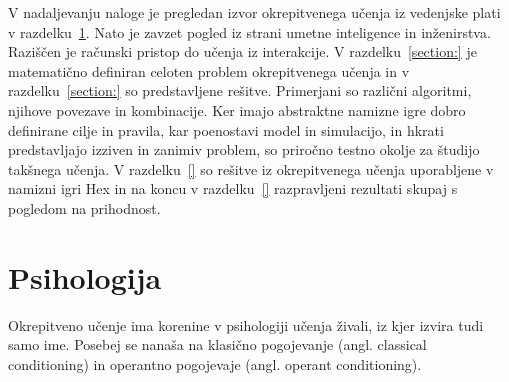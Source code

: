 \documentclass[a4paper, oneside, 12pt]{report}
\begin{document}
V nadaljevanju naloge je pregledan izvor okrepitvenega učenja iz vedenjske plati v razdelku~\ref{section:Psychology}. Nato je zavzet pogled iz strani umetne inteligence in inženirstva. Raziščen je računski pristop do učenja iz interakcije. V razdelku~\ref{section:} je matematično definiran celoten problem okrepitvenega učenja in v razdelku~\ref{section:} so predstavljene rešitve. Primerjani so različni algoritmi, njihove povezave in kombinacije. Ker imajo abstraktne namizne igre dobro definirane cilje in pravila, kar poenostavi model in simulacijo, in hkrati predstavljajo izziven in zanimiv problem, so priročno testno okolje za študijo takšnega učenja. 
V razdelku~\ref{} so rešitve iz okrepitvenega učenja uporabljene v namizni igri Hex in na koncu v razdelku~\ref{} razpravljeni rezultati skupaj s pogledom na prihodnost.

\section{Psihologija} \label{section:Psychology}
Okrepitveno učenje ima korenine v psihologiji učenja živali, iz kjer izvira tudi samo ime. Posebej se nanaša na klasično pogojevanje (angl. classical conditioning) in operantno pogojevaje (angl. operant conditioning).
\end{document}
